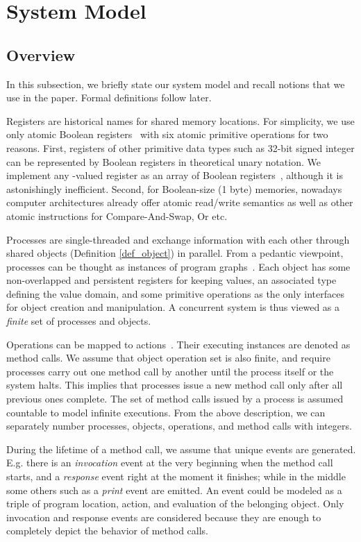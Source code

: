 \documentclass[a4paper,USenglish]{lipics-v2016}
\begin{document}
\section{System Model}\label{sec:foundation}

\subsection{Overview}\label{sec:model_overview}

In this subsection, we briefly state our system model and recall notions that we use in the paper.
Formal definitions follow later.

Registers are historical names for shared memory locations.
For simplicity, we use only atomic Boolean registers~\cite{Lamport86-1, Lamport86-2}
with six atomic primitive operations for two reasons.
First, registers of other primitive data types such as 32-bit signed integer can be represented by Boolean registers in theoretical unary notation.
We implement any -valued register as an array of  Boolean registers~\cite{Herlihy08},
although it is astonishingly inefficient.
Second, for Boolean-size (1 byte) memories, nowadays computer architectures already offer atomic read/write semantics as well as other atomic instructions for Compare-And-Swap, Or etc.


Processes are single-threaded and exchange information with each other through shared objects (Definition \ref{def_object}) in parallel.
From a pedantic viewpoint, processes can be thought as instances of program graphs~\cite{Pnueli92}.
Each object has some non-overlapped and persistent registers for keeping values,
an associated type defining the value domain,
and some primitive operations as the only interfaces for object creation and manipulation.
A concurrent system is thus viewed as a \textit{finite} set of processes and objects.

Operations can be mapped to actions~\cite{Kropf99}.
Their executing instances are denoted as method calls.
We assume that object operation set is also finite,
and require processes carry out one method call by another until the process itself or the system halts.
This implies that processes issue a new method call only after all previous ones complete.
The set of method calls issued by a process is assumed countable to model infinite executions.
From the above description, we can separately number processes, objects, operations, and method calls with integers.

During the lifetime of a method call, we assume that unique events are generated.
E.g. there is an \textit{invocation} event at the very beginning when the method call starts,
and a \textit{response} event right at the moment it finishes;
while in the middle some others such as a \textit{print} event are emitted.
An event could be modeled as a triple of program location, action, and evaluation of the belonging object.
Only invocation and response events are considered
because they are enough to completely depict the behavior of method calls.
\end{document}
